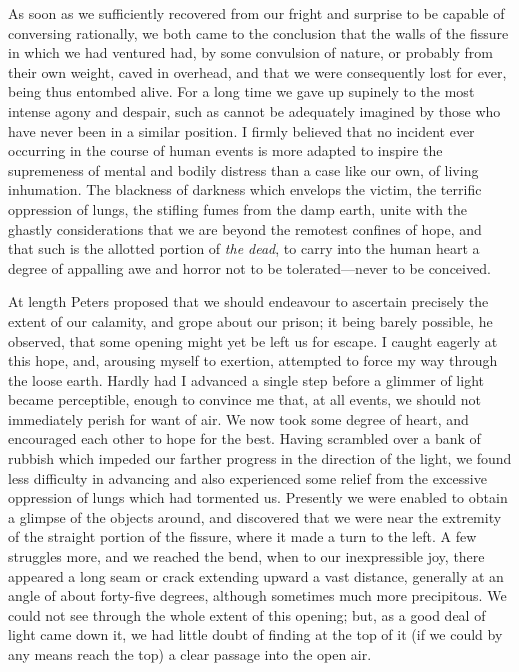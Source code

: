 As soon as we sufficiently recovered from our fright and surprise to be
capable of conversing rationally, we both came to the conclusion that the walls
of the fissure in which we had ventured had, by some convulsion of nature, or
probably from their own weight, caved in overhead, and that we were consequently
lost for ever, being thus entombed alive. For a long time we gave up supinely to
the most intense agony and despair, such as cannot be adequately imagined by
those who have never been in a similar position. I firmly believed that no
incident ever occurring in the course of human events is more adapted to inspire
the supremeness of mental and bodily distress than a case like our own, of
living inhumation. The blackness of darkness which envelops the victim, the
terrific oppression of lungs, the stifling fumes from the damp earth, unite with
the ghastly considerations that we are beyond the remotest confines of hope, and
that such is the allotted portion of \emph{the dead}, to carry into the human
heart a degree of appalling awe and horror not to be tolerated---never to be
conceived. 

At length Peters proposed that we should endeavour to ascertain precisely the
extent of our calamity, and grope about our prison; it being barely possible, he
observed, that some opening might yet be left us for escape. I caught eagerly at
this hope, and, arousing myself to exertion, attempted to force my way through
the loose earth. Hardly had I advanced a single step before a glimmer of light
became perceptible, enough to convince me that, at all events, we should not
immediately perish for want of air. We now took some degree of heart, and
encouraged each other to hope for the best. Having scrambled over a bank of
rubbish which impeded our farther progress in the direction of the light, we
found less difficulty in advancing and also experienced some relief from the
excessive oppression of lungs which had tormented us. Presently we were enabled
to obtain a glimpse of the objects around, and discovered that we were near the
extremity of the straight portion of the fissure, where it made a turn to the
left. A few struggles more, and we reached the bend, when to our inexpressible
joy, there appeared a long seam or crack extending upward a vast distance,
generally at an angle of about forty-five degrees, although sometimes much more
precipitous. We could not see through the whole extent of this opening; but, as
a good deal of light came down it, we had little doubt of finding at the top of
it (if we could by any means reach the top) a clear passage into the open
air. 

